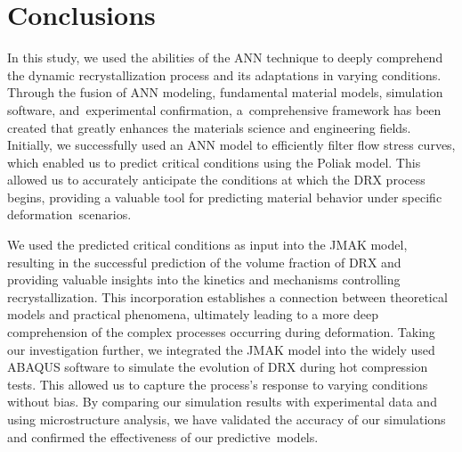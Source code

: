 \documentclass[metals,article,accept,pdftex,moreauthors]{Definitions/mdpi}
\begin{document}
\section{Conclusions}\label{sec:Conclusions}

In this study, we used the abilities of the ANN technique to deeply comprehend the dynamic recrystallization process and its adaptations in varying conditions.
Through the fusion of ANN modeling, fundamental material models, simulation software, and~experimental confirmation, a~comprehensive framework has been created that greatly enhances the materials science and engineering fields.
Initially, we successfully used an ANN model to efficiently filter flow stress curves, which enabled us to predict critical conditions using the Poliak model.
This allowed us to accurately anticipate the conditions at which the DRX process begins, providing a valuable tool for predicting material behavior under specific deformation~scenarios.

We used the predicted critical conditions as input into the JMAK model, resulting in the successful prediction of the volume fraction of DRX and providing valuable insights into the kinetics and mechanisms controlling recrystallization.
This incorporation establishes a connection between theoretical models and practical phenomena, ultimately leading to a more deep comprehension of the complex processes occurring during deformation.
\linebreak Taking our investigation further, we integrated the JMAK model into the widely used ABAQUS software to simulate the evolution of DRX during hot compression tests.
\linebreak This allowed us to capture the process's response to varying conditions without bias.
By comparing our simulation results with experimental data and using microstructure analysis, we have validated the accuracy of our simulations and confirmed the effectiveness of our predictive~models.

\end{document}
